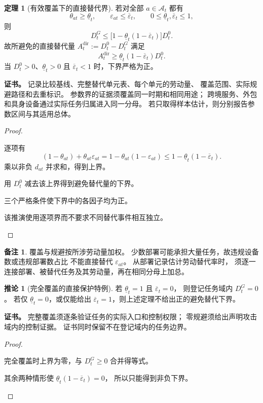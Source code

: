 \documentclass[UTF8,12pt,a4paper,openany,fontset=none,zihao=false]{ctexrep}
\theoremstyle{definition}
\newtheorem{theorem}{定理}[chapter]
\newtheorem{corollary}{推论}[chapter]
\newtheorem{remark}{备注}[chapter]
\newenvironment{certificate}{\par\noindent\textbf{证书。}\ignorespaces}{\par}
\newcommand{\1}{\mathbf 1}
\begin{document}
\begin{theorem}[有效覆盖下的直接替代界]
\label{lab:thm-direct-bound}
若对全部 \(a\in\mathcal A_t\) 都有
\[
 \theta_{at}\ge\underline\theta_t,
 \qquad
 \varepsilon_{at}\le\overline\varepsilon_t,
 \qquad
 0\le\underline\theta_t,\overline\varepsilon_t\le1,
\]
则
\[
 D_t^G
 \le
 \bigl[1-\underline\theta_t(1-\overline\varepsilon_t)\bigr]D_t^0.
\]
故所避免的直接替代量
\(A_t^{\mathrm{dir}}:=D_t^0-D_t^G\) 满足
\[
 A_t^{\mathrm{dir}}
 \ge\underline\theta_t(1-\overline\varepsilon_t)D_t^0.
\]
当 \(D_t^0>0\)、\(\underline\theta_t>0\) 且
\(\overline\varepsilon_t<1\) 时，下界严格为正。
\end{theorem}
\begin{certificate}
记录比较基线、完整替代单元表、每个单元的劳动量、
覆盖范围、实际规避路径和去重标识。
参数界的证据须覆盖同一时期和相同用途；
跨境服务、外包和具身设备通过实际任务归属进入同一分母。
若只取得样本估计，则分别报告参数区间与其适用总体。
\end{certificate}
\begin{proof}
\begin{semanticsteps}
\item 逐项有
\[
 (1-\theta_{at})+\theta_{at}\varepsilon_{at}
 =1-\theta_{at}(1-\varepsilon_{at})
 \le1-\underline\theta_t(1-\overline\varepsilon_t).
\]
乘以非负 \(d_{at}\) 并求和，得到上界。
\item 用 \(D_t^0\) 减去该上界得到避免替代量的下界。
\item 三个严格条件使下界中的各因子均为正。
\item 该推演使用逐项界而不要求不同替代事件相互独立。
\end{semanticsteps}
\end{proof}

\begin{remark}
覆盖与规避按所涉劳动量加权。
少数部署可能承担大量任务，故违规设备数或违规部署数占比
不能直接替代 \(\varepsilon_{at}\)。
从部署记录估计劳动替代率时，
须逐一连接部署、被替代任务及其劳动量，再在相同分母上加总。
\end{remark}

\begin{corollary}[完全覆盖的直接保护特例]
\label{lab:cor-perfect-gate}
若 \(\underline\theta_t=1\) 且 \(\overline\varepsilon_t=0\)，
则登记任务域内 \(D_t^G=0\)。
若仅 \(\underline\theta_t=0\)，或仅能给出
\(\overline\varepsilon_t=1\)，则上述定理不给出正的避免替代下界。
\end{corollary}
\begin{certificate}
完整覆盖须逐条验证任务的实际入口和控制权限；
零规避须给出声明攻击域内的控制证据。
证书同时保留不在登记域内的任务边界。
\end{certificate}
\begin{proof}
\begin{semanticsteps}
\item 完全覆盖时上界为零，与 \(D_t^G\ge0\) 合并得等式。
\item 其余两种情形使
\(\underline\theta_t(1-\overline\varepsilon_t)=0\)，
所以只能得到非负下界。
\end{semanticsteps}
\end{proof}
\end{document}

